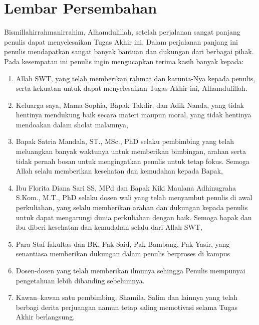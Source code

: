 \chapter*{Lembar Persembahan}

  Bismillahirrahmanirrahim, Alhamdulillah, setelah perjalanan sangat panjang penulis dapat menyelesaikan Tugas Akhir ini. Dalam perjalanan panjang ini penulis mendapatkan sangat banyak bantuan dan dukungan dari berbagai pihak. Pada kesempatan ini penulis ingin mengucapkan terima kasih banyak kepada:
  \begin{enumerate}
      \item Allah SWT, yang telah memberikan rahmat dan karunia-Nya kepada penulis, serta kekuatan untuk dapat menyelesaikan Tugas Akhir ini,
Alhamdulillah.
      \item Keluarga saya, Mama Sophia, Bapak Takdir, dan Adik Nanda, yang tidak hentinya mendukung baik secara materi maupun moral, yang tidak hentinya mendoakan dalam sholat malamnya,
      \item Bapak Satria Mandala, ST., MSc., PhD selaku pembimbing  yang telah meluangkan banyak waktunya untuk memberikan bimbingan, arahan serta tidak pernah bosan untuk mengingatkan penulis untuk tetap fokus. Semoga Allah selalu memberikan kesehatan dan kemudahan kepada Bapak,
      \item Ibu Florita Diana Sari SS, MPd dan Bapak Kiki Maulana Adhinugraha S.Kom., M.T., PhD selaku dosen wali yang telah menyambut penulis di awal perkuliahan, yang selalu memberikan arahan dan dukungan kepada penulis untuk dapat mengarungi dunia perkuliahan dengan baik. Semoga bapak dan ibu diberi kesehatan dan kemudahan selalu dari Allah SWT,
      \item Para Staf fakultas dan BK, Pak Said, Pak Bambang, Pak Yasir, yang senantiasa memberikan dukungan dalam penulis berproses di kampus
      \item Dosen-dosen yang telah memberikan ilmunya sehingga Penulis mempunyai pengetahuan lebih dibanding sebelumnya.
      \item Kawan–kawan satu pembimbing, Shamila, Salim dan lainnya yang telah berbagi derita perjuangan namun tetap saling memotivasi selama Tugas Akhir berlangsung.

\end{enumerate}
